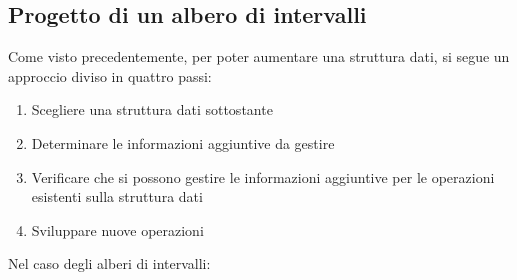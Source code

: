 \documentclass[10pt, a4paper]{report}
\begin{document}
\subsection{Progetto di un albero di intervalli}
Come visto precedentemente, per poter aumentare una struttura dati, si segue un approccio diviso in quattro passi:
\begin{enumerate}
\item Scegliere una struttura dati sottostante
\item Determinare le informazioni aggiuntive da gestire
\item Verificare che si possono gestire le informazioni aggiuntive per le operazioni esistenti sulla struttura dati
\item Sviluppare nuove operazioni
\end{enumerate}
Nel caso degli alberi di intervalli:
\end{document}
